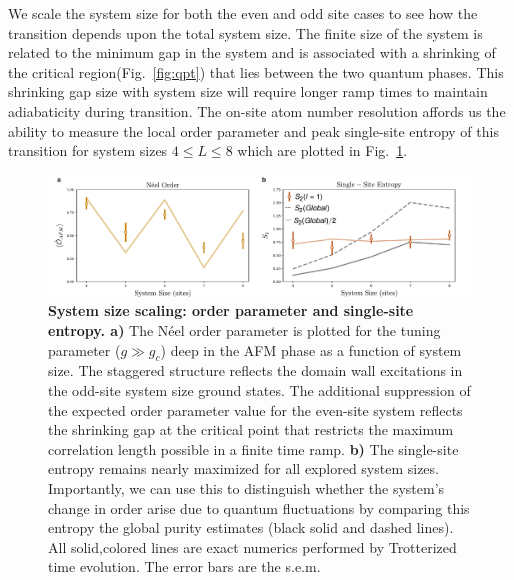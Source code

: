 %


We scale the system size for both the even and odd site cases to see how the transition depends upon the total system size. The finite size of the system is related to the minimum gap in the system and is associated with a shrinking of the critical region(Fig.~\ref{fig:qpt}) that lies between the two quantum phases\cite{Sachdev2011}. This shrinking gap size with system size will require longer ramp times to maintain adiabaticity during transition. The on-site atom number resolution affords us the ability to measure the local order parameter and peak single-site entropy of this transition for system sizes $4\leq L \leq 8$ which are plotted in Fig.~\ref{fig:n_scale}.


\begin{figure}[t!]
		\includegraphics[width=\columnwidth]{figures/ch3/ising_data/SingleParamEdit_2v2edit.pdf} 
		\caption{\textbf{System size scaling: order parameter and single-site entropy. a)} The N\'eel order parameter is plotted for the tuning parameter ($g\gg g_c$) deep in the AFM phase as a function of system size. The staggered structure reflects the domain wall excitations in the odd-site system size ground states. The additional suppression of the expected order parameter value for the even-site system reflects the shrinking gap at the critical point that restricts the maximum correlation length possible in a finite time ramp. \textbf{b)}  The single-site entropy remains nearly maximized for all explored system sizes. Importantly, we can use this to distinguish whether the system's change in order arise due to quantum fluctuations by comparing this entropy the global purity estimates (black solid and dashed lines). All solid,colored lines are exact numerics performed by Trotterized time evolution. The error bars are the s.e.m.}
		\label{fig:n_scale}	
\end{figure}

